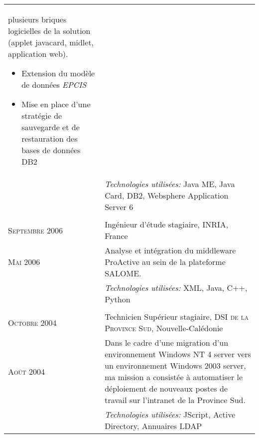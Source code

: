 \begin{longtable}{R{2.5cm}|p{14.8cm}}
{ 		plusieurs briques logicielles de la solution (applet javacard, midlet,
 		application web).
 	 	\begin{itemize}
			\item Extension du modèle de données \emph{EPCIS}
			\item Mise en place d'une stratégie de sauvegarde et de restauration des bases de données DB2
		\end{itemize}
		\vspace{-1em}
	}\\&
 	\footnotesize{\emph{Technologies utilisées:} Java ME, Java Card, DB2, Websphere Application Server 6 }\\
   \\
  	\textsc{Septembre 2006} & Ingénieur d'étude stagiaire, \textsc{INRIA}, France\\
  	\textsc{Mai 2006}&\footnotesize{Analyse et intégration du middleware ProActive au sein de la plateforme SALOME.}\\&
  	\footnotesize{\emph{Technologies utilisées:} XML, Java, C++, Python}\\
  \\
 	\textsc{Octobre 2004} & Technicien Supérieur stagiaire, \textsc{DSI de la Province Sud}, Nouvelle-Calédonie\\
 	\textsc{Août 2004}&\footnotesize{Dans le cadre d'une migration d'un environnement Windows NT 4 server vers un environnement Windows 
 	2003 server, ma mission a consistée à automatiser le déploiement de nouveaux postes de travail sur l'intranet de la Province Sud. }\\&
 	\footnotesize{\emph{Technologies utilisées:} JScript, Active Directory, Annuaires LDAP}\\
\end{longtable}
